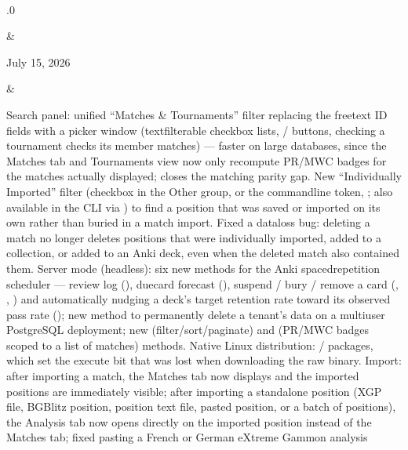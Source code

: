 \documentclass[letterpaper,10pt,english]{sphinxmanual}
\begin{document}
\begin{savenotes}
\begin{longtable}{}
\begin{varwidth}[t]{}
\sphinxbeforeendvarwidth
\end{varwidth}%
\\
\sphinxhline\begin{varwidth}[t]{}
.0
\sphinxbeforeendvarwidth
\end{varwidth}%
&\begin{varwidth}[t]{}
\sphinxAtStartPar
July 15, 2026
\sphinxbeforeendvarwidth
\end{varwidth}%
&\begin{varwidth}[t]{}
\sphinxAtStartPar
Search panel: unified “Matches \& Tournaments” filter replacing the free\sphinxhyphen{}text ID fields with a picker window (text\sphinxhyphen{}filterable checkbox lists, / buttons, checking a tournament checks its member matches) — faster on large databases, since the Matches tab and Tournaments view now only recompute PR/MWC badges for the matches actually displayed;  closes the matching parity gap. New “Individually Imported” filter (checkbox in the Other group, or the  command\sphinxhyphen{}line token, ; also available in the CLI via ) to find a position that was saved or imported on its own rather than buried in a match import. Fixed a data\sphinxhyphen{}loss bug: deleting a match no longer deletes positions that were individually imported, added to a collection, or added to an Anki deck, even when the deleted match also contained them. Server mode (headless): six new methods for the Anki spaced\sphinxhyphen{}repetition scheduler — review log (), due\sphinxhyphen{}card forecast (), suspend / bury / remove a card (, , ) and automatically nudging a deck’s target retention rate toward its observed pass rate (); new  method to permanently delete a tenant’s data on a multi\sphinxhyphen{}user PostgreSQL deployment; new  (filter/sort/paginate) and  (PR/MWC badges scoped to a list of matches) methods. Native Linux distribution: / packages, which set the execute bit that was lost when downloading the raw binary. Import: after importing a match, the Matches tab now displays and the imported positions are immediately visible; after importing a standalone position (XGP file, BGBlitz position, position text file, pasted position, or a batch of positions), the Analysis tab now opens directly on the imported position instead of the Matches tab; fixed pasting a French or German eXtreme Gammon analysis 
\end{varwidth}
\end{longtable}
\end{savenotes}
\end{document}
